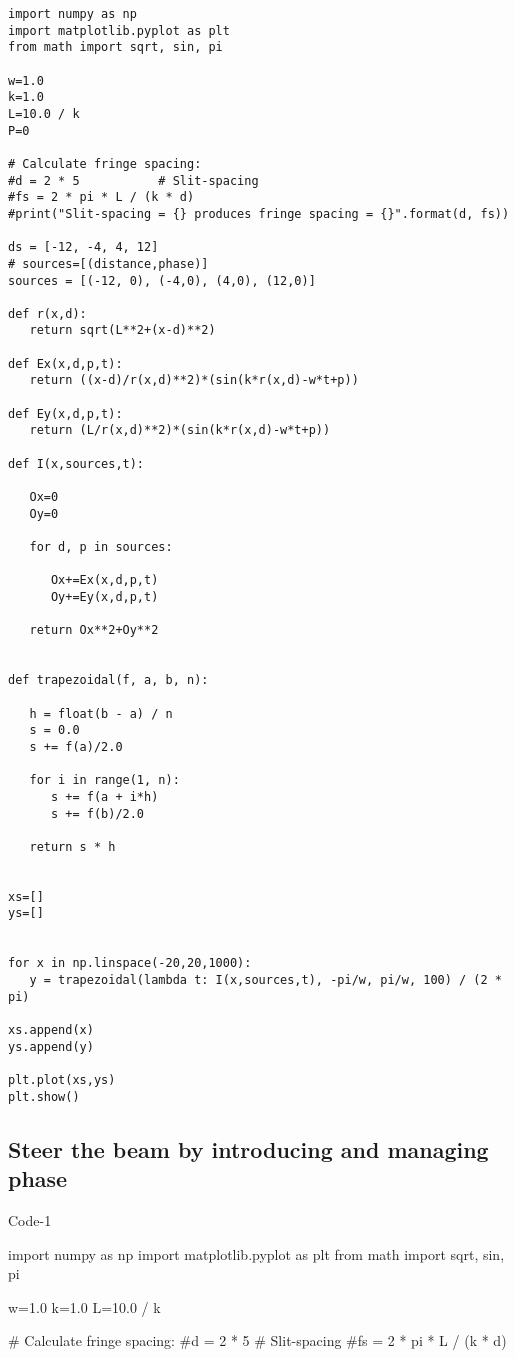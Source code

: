 \begin{Verbatim}[fontsize=\small,baselinestretch=0.9]
import numpy as np
import matplotlib.pyplot as plt
from math import sqrt, sin, pi

w=1.0
k=1.0
L=10.0 / k
P=0

# Calculate fringe spacing:
#d = 2 * 5           # Slit-spacing
#fs = 2 * pi * L / (k * d)
#print("Slit-spacing = {} produces fringe spacing = {}".format(d, fs))

ds = [-12, -4, 4, 12]
# sources=[(distance,phase)]
sources = [(-12, 0), (-4,0), (4,0), (12,0)]

def r(x,d):
   return sqrt(L**2+(x-d)**2)

def Ex(x,d,p,t):
   return ((x-d)/r(x,d)**2)*(sin(k*r(x,d)-w*t+p))

def Ey(x,d,p,t):
   return (L/r(x,d)**2)*(sin(k*r(x,d)-w*t+p))

def I(x,sources,t):

   Ox=0
   Oy=0

   for d, p in sources:

      Ox+=Ex(x,d,p,t)
      Oy+=Ey(x,d,p,t)

   return Ox**2+Oy**2


def trapezoidal(f, a, b, n):

   h = float(b - a) / n
   s = 0.0
   s += f(a)/2.0

   for i in range(1, n):
      s += f(a + i*h)
      s += f(b)/2.0

   return s * h


xs=[]
ys=[]


for x in np.linspace(-20,20,1000):
   y = trapezoidal(lambda t: I(x,sources,t), -pi/w, pi/w, 100) / (2 * pi)

xs.append(x)
ys.append(y)

plt.plot(xs,ys)
plt.show()   
\end{Verbatim}

\subsection{Steer the beam by introducing and managing phase}

Code-1

import numpy as np
import matplotlib.pyplot as plt
from math import sqrt, sin, pi

w=1.0
k=1.0
L=10.0 / k

# Calculate fringe spacing:
#d = 2 * 5           
# Slit-spacing
#fs = 2 * pi * L / (k * d)


